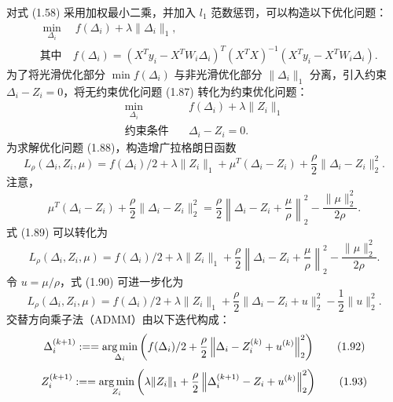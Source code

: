 对式 (1.58) 采用加权最小二乘，并加入 $l_1$ 范数惩罚，可以构造以下优化问题：
\begin{equation}
 \begin{aligned}
 &\min_{\Delta_i}\quad f(\Delta_i)+\lambda\lVert\Delta_i\rVert_1,\\
 &\text{其中}\quad
 f(\Delta_i)=(X^{T}y_i-X^{T}W_i\Delta_i)^{T}(X^{T}X)^{-1}
                   (X^{T}y_i-X^{T}W_i\Delta_i).
 \end{aligned}
 \tag{1.87}
\end{equation}
为了将光滑优化部分 $\min f(\Delta_i)$ 与非光滑优化部分 $\lVert\Delta_i\rVert_1$ 分离，引入约束 $\Delta_i-Z_i=0$，将无约束优化问题 (1.87) 转化为约束优化问题：
\begin{equation}
 \begin{aligned}
 \min_{\Delta_i}\quad&f(\Delta_i)+\lambda\lVert Z_i\rVert_1\\
 \text{约束条件}\quad&\Delta_i-Z_i=0.
 \end{aligned}
 \tag{1.88}
\end{equation}
为求解优化问题 (1.88)，构造增广拉格朗日函数
\begin{equation}
 L_\rho(\Delta_i,Z_i,\mu)
 =f(\Delta_i)/2+\lambda\lVert Z_i\rVert_1
   +\mu^{T}(\Delta_i-Z_i)+\frac\rho2\lVert\Delta_i-Z_i\rVert_2^2.
 \tag{1.89}
\end{equation}
注意，
\[
 \mu^{T}(\Delta_i-Z_i)+\frac\rho2\lVert\Delta_i-Z_i\rVert_2^2
 =\frac\rho2\left\lVert\Delta_i-Z_i+\frac\mu\rho\right\rVert_2^2
    -\frac{\lVert\mu\rVert_2^2}{2\rho}.
\]
式 (1.89) 可以转化为
\begin{equation}
 L_\rho(\Delta_i,Z_i,\mu)
 =f(\Delta_i)/2+\lambda\lVert Z_i\rVert_1
  +\frac\rho2\left\lVert\Delta_i-Z_i+\frac\mu\rho\right\rVert_2^2
  -\frac{\lVert\mu\rVert_2^2}{2\rho}.
 \tag{1.90}
\end{equation}
令 $u=\mu/\rho$，式 (1.90) 可进一步化为
\begin{equation}
 L_\rho(\Delta_i,Z_i,\mu)
 =f(\Delta_i)/2+\lambda\lVert Z_i\rVert_1
    +\frac\rho2\lVert\Delta_i-Z_i+u\rVert_2^2
    -\frac12\lVert u\rVert_2^2.
 \tag{1.91}
\end{equation}
交替方向乘子法（ADMM）由以下迭代构成：
\begin{equation}
 \Delta_i^{(k+1)}\mathrel{:==}\operatorname*{arg\,min}_{\Delta_i}
 \left(f(\Delta_i)/2+\frac\rho2
       \left\lVert\Delta_i-Z_i^{(k)}+u^{(k)}\right\rVert_2^2\right)
 \tag{1.92}
\end{equation}
\begin{equation}
 Z_i^{(k+1)}\mathrel{:==}\operatorname*{arg\,min}_{Z_i}
 \left(\lambda\lVert Z_i\rVert_1+\frac\rho2
       \left\lVert\Delta_i^{(k+1)}-Z_i+u^{(k)}\right\rVert_2^2\right)
 \tag{1.93}
\end{equation}
